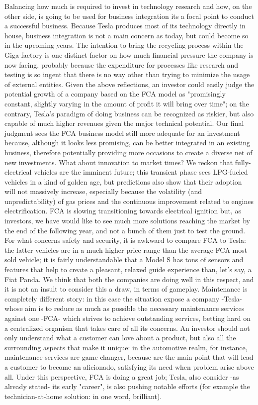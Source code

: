 Balancing how much is required to invest in technology research and how, on the other side, is going to be used for business integration its a focal point to conduct a successful business. Because Tesla produces most of its technology directly in house, business integration is not a main concern as today, but could become so in the upcoming years. The intention to bring the recycling process within the Giga-factory is one distinct factor on how much financial pressure the company is now facing, probably because the expenditure for processes like research and testing is so ingent that there is no way other than trying to minimize the usage of external entities. Given the above reflections, an investor could easily judge the potential growth of a company based on the FCA model as "promisingly constant, slightly varying in the amount of profit it will bring over time"; on the contrary, Tesla's paradigm of doing business can be recognized as riskier, but also capable of much higher revenues given the major technical potential.
Our final judgment sees the FCA business model still more adequate for an investment because, although it looks less promising, can be better integrated in an existing business, therefore potentially providing more occasions to create a diverse net of new investments. 
What about innovation to market times? We reckon that fully-electrical vehicles are the imminent future; this transient phase sees LPG-fueled vehicles in a kind of golden age, but predictions also show that their adoption will not massively increase, especially because the volatility (and unpredictability) of gas prices and the continuous improvement related to engines electrification. FCA is slowing transitioning towards electrical ignition but, as investors, we have would like to see much more solutions reaching the market by the end of the following year, and not a bunch of them just to test the ground.
For what concerns safety and security, it is awkward to compare FCA to Tesla: the latter vehicles are in a much higher price range than the average FCA most sold vehicle; it is fairly understandable that a Model S has tons of sensors and features that help to create a pleasant, relaxed guide experience than, let's say, a Fiat Panda. We think that both the companies are doing well in this respect, and it is not an insult to consider this a draw, in terms of gameplay. Maintenance is completely different story: in this case the situation expose a company -Tesla- whose aim is to reduce as much as possible the necessary maintenance services against one -FCA- which strives to achieve outstanding services, betting hard on a centralized organism that takes care of all its concerns. An investor should not only understand what a customer can love about a product, but also all the surrounding aspects that make it unique: in the automotive realm, for instance, maintenance services are game changer, because are the main point that will lead a customer to become an aficionado, satisfying its need when problem arise above all. Under this perspective, FCA is doing a great job; Tesla, also consider -as already stated- its early "career", is also pushing notable efforts (for example the technician-at-home solution: in one word, brilliant).